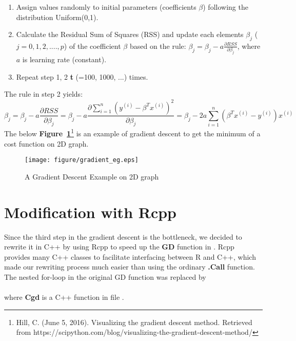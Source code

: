 \documentclass[12pt, letterpaper]{article} %
\begin{document}
\begin{enumerate}
    \item Assign values randomly to initial parameters (coefficients $\beta$) following the distribution Uniform(0,1).
    \item Calculate the Residual Sum of Squares (RSS) and update each elements $\beta_j$ ($j=0,1,2,...., p$) of the coefficient $\beta$ based on the rule: $\beta_j=\beta_j-a\frac{\partial RSS}{\partial \beta_j}$, where $a$ is learning rate (constant).
    \item Repeat step 1, 2 \textbf{t} (=100, 1000, ...) times.
\end{enumerate}
\noindent
The rule in step 2 yields:
$$\beta_j=\beta_j-a\frac{\partial RSS}{\partial \beta_j}=\beta_j-a\frac{\partial  \sum_{i=1}^{n}(y^{(i)}-\beta^Tx^{(i)})^2}{\partial \beta_j}=\beta_j-2a\sum_{i=1}^{n}(\beta^Tx^{(i)}-y^{(i)})x^{(i)}$$
\noindent
The below \textbf{Figure~\ref{fig:grad}}\footnote{Hill, C. (June 5, 2016). Visualizing the gradient descent method. Retrieved from https://scipython.com/blog/visualizing-the-gradient-descent-method/} is an example of gradient descent to get the minimum of a cost function on 2D graph.

\begin{figure}[htpb!] %
    \centering %
\texttt{[image: figure/gradient\_eg.eps]}%
    \caption{A Gradient Descent Example on 2D graph} %
    \label{fig:grad} %
\end{figure}

\vspace*{-18mm}
\section{Modification with Rcpp}
\vspace*{-5mm}
Since the third step in the gradient descent is the bottleneck, we decided to rewrite it in C++ by using Rcpp to speed up the \textbf{GD} function in . Rcpp provides many C++ classes to facilitate interfacing between R and C++, which made our rewriting process much easier than using the ordinary \textbf{.Call} function. The nested for-loop in the original GD function was replaced by \\
\\
\noindent
where \textbf{Cgd} is a C++ function in file .\\
\end{document}

